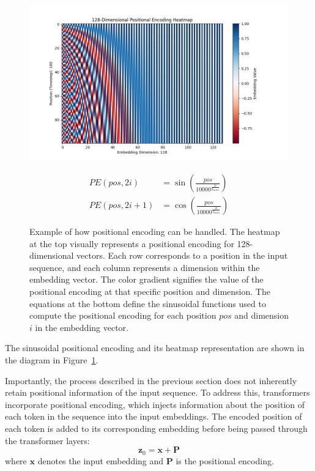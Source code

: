 \documentclass{pracalicmgr}
\begin{document}
\begin{figure}[H]
    \centering
    \begin{minipage}{0.8\textwidth}
        \centering
        \includegraphics[width=\textwidth]{src/embedings.png}
    \end{minipage}
    \vspace{0.2cm}
    \begin{minipage}{0.7\textwidth}
        \centering
        \begin{align*}
        PE(pos, 2i) &= \sin\left(\frac{pos}{10000^{\frac{2i}{d_{\text{model}}}}}\right) \\
        PE(pos, 2i + 1) &= \cos\left(\frac{pos}{10000^{\frac{2i}{d_{\text{model}}}}}\right)
        \end{align*}
    \end{minipage}
    \label{fig:positionalEncoding}
    \caption{Example of how positional encoding can be handled. The heatmap at the top visually represents a positional encoding for 128-dimensional vectors. Each row corresponds to a position in the input sequence, and each column represents a dimension within the embedding vector. The color gradient signifies the value of the positional encoding at that specific position and dimension. The equations at the bottom define the sinusoidal functions used to compute the positional encoding for each position \( pos \) and dimension \( i \) in the embedding vector.\cite{Kubo2024Transformer}}
\end{figure}

The sinusoidal positional encoding and its heatmap representation are shown in the diagram in Figure~\ref{fig:positionalEncoding}.

Importantly, the process described in the previous section does not inherently retain positional information of the input sequence. To address this, transformers incorporate positional encoding, which injects information about the position of each token in the sequence into the input embeddings. The encoded position of each token is added to its corresponding embedding before being passed through the transformer layers:
\[
\mathbf{z}_0 = \mathbf{x} + \mathbf{P}
\]
where \( \mathbf{x} \) denotes the input embedding and \( \mathbf{P} \) is the positional encoding.
\end{document}
